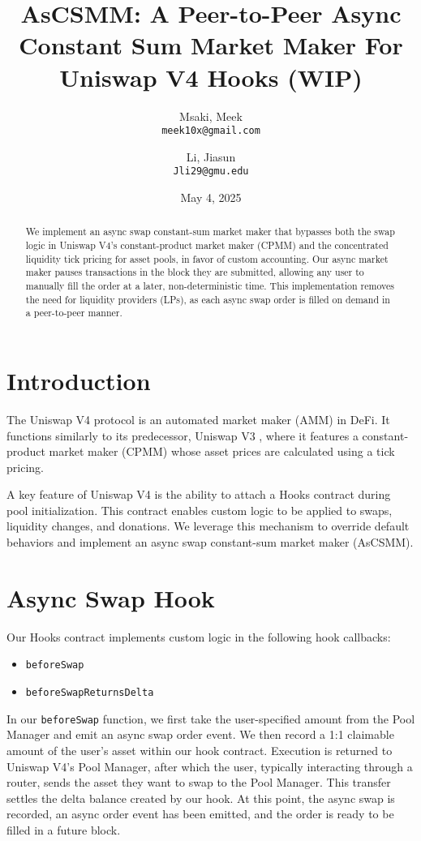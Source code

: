 \documentclass[bibliography=numbered]{article}
\title{AsCSMM: A Peer-to-Peer Async Constant Sum Market Maker For Uniswap V4 Hooks (WIP)}
\author{
  Msaki, Meek\\
  \texttt{meek10x@gmail.com}
  \and
  Li, Jiasun\\
  \texttt{Jli29@gmu.edu}
}
\date{May 4, 2025}
\begin{document}
\maketitle

\begin{abstract}
    We implement an async swap constant-sum market maker that bypasses both the swap logic in Uniswap V4’s constant-product market maker (CPMM) and the concentrated liquidity tick pricing for asset pools, in favor of custom accounting. Our async market maker pauses transactions in the block they are submitted, allowing any user to manually fill the order at a later, non-deterministic time. This implementation removes the need for liquidity providers (LPs), as each async swap order is filled on demand in a peer-to-peer manner.
\end{abstract}

\section{Introduction}

The Uniswap V4 \cite{UniswapV4} protocol is an automated market maker (AMM) in DeFi. It functions similarly to its predecessor, Uniswap V3 \cite{UniswapV3}, where it features a constant-product market maker (CPMM) whose asset prices are calculated using a tick pricing.  

A key feature of Uniswap V4 is the ability to attach a Hooks contract during pool initialization. This contract enables custom logic to be applied to swaps, liquidity changes, and donations. We leverage this mechanism to override default behaviors and implement an async swap constant-sum market maker (AsCSMM).

\section{Async Swap Hook}

Our Hooks contract implements custom logic in the following hook callbacks:

\begin{itemize}
\item \texttt{beforeSwap}
\item \texttt{beforeSwapReturnsDelta}
\end{itemize}

In our \texttt{beforeSwap} function, we first take the user-specified amount from the Pool Manager and emit an async swap order event. We then record a 1:1 claimable amount of the user's asset within our hook contract. Execution is returned to Uniswap V4’s Pool Manager, after which the user, typically interacting through a router, sends the asset they want to swap to the Pool Manager. This transfer settles the delta balance created by our hook. At this point, the async swap is recorded, an async order event has been emitted, and the order is ready to be filled in a future block.
\end{document}
